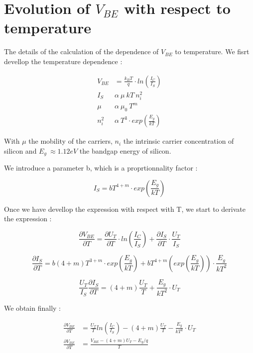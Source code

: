 \chapter{Evolution of $V_{BE}$ with respect to temperature}

The details of the calculation of the dependence of $V_{BE}$ to temperature. We fisrt devellop the temperature dependence : 

\begin{align}
  V_{BE} & = \frac{k_BT}{q} \cdot ln \left( \frac{I_C}{I_S} \right) \\
  I_S ~   & \alpha ~ \mu ~ k T ~ n_i^2 \\
  \mu ~   & \alpha ~ \mu_0 ~ T^m \\
  n_i^2 ~ & \alpha~ T^3  \cdot  exp\left(\frac{E_g}{kT}\right)
\end{align}

With $\mu$ the mobility of the carriers, $n_i$ the intrinsic carrier concentration of silicon and $E_g~\approx 1.12 eV$ the bandgap energy of silicon.

We introduce a parameter b, which is a proprtionnality factor :

\begin{equation}
  I_S = b T^{4+m} \cdot exp\left(\frac{E_g}{kT}\right)
\end{equation}

Once we have devellop the expression with respect with T, we start to derivate the expression : 

\begin{equation}
    \frac{\partial V_{BE}}{\partial T} = \frac{\partial U_{T}}{\partial T}\cdot ln \left( \frac{I_C}{I_S} \right) + \frac{\partial I_{S}}{\partial T} \cdot \frac{U_T}{I_S}
\end{equation}

\begin{equation}
  \frac{\partial I_{S}}{\partial T} = b(4+m)T^{3+m}\cdot exp\left(\frac{E_g}{kT}\right) + bT^{4+m}\left(exp\left(\frac{E_g}{kT}\right)\right)\cdot \frac{E_g}{k T^{2}} 
\end{equation}

  
\begin{equation}
  \frac{U_T}{I_S} \frac{\partial I_{S}}{\partial T} = (4+m)\frac{U_T}{T} + \frac{E_g}{kT^2}\cdot U_T
\end{equation}

We obtain finally :

\begin{align}
  \frac{\partial V_{BE}}{\partial T} & = \frac{U_T}{T} ln \left( \frac{I_C}{I_S} \right) - (4+m)\frac{U_T}{T} - \frac{E_g}{kT^2}\cdot U_T \\
  \frac{\partial V_{BE}}{\partial T} & = \frac{V_{BE} - (4+m)U_T - E_g/q}{T}
\end{align}

